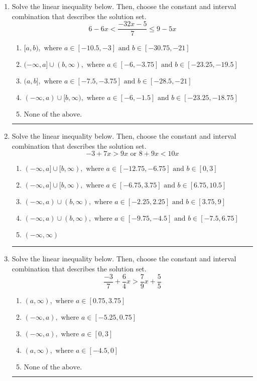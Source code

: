 \documentclass[14pt]{extbook}
\newcommand{\litem}[1]{\item#1\hspace*{-1cm}\rule{\textwidth}{0.4pt}}
\begin{document}
\begin{enumerate}
{\begin{enumerate}[label=\Alph*.]
\end{enumerate} }
\litem{
Solve the linear inequality below. Then, choose the constant and interval combination that describes the solution set.\[ 6 - 6 x < \frac{-32 x - 5}{7} \leq 9 - 5 x \]\begin{enumerate}[label=\Alph*.]
\item \( [a, b), \text{ where } a \in [-10.5, -3] \text{ and } b \in [-30.75, -21] \)
\item \( (-\infty, a] \cup (b, \infty), \text{ where } a \in [-6, -3.75] \text{ and } b \in [-23.25, -19.5] \)
\item \( (a, b], \text{ where } a \in [-7.5, -3.75] \text{ and } b \in [-28.5, -21] \)
\item \( (-\infty, a) \cup [b, \infty), \text{ where } a \in [-6, -1.5] \text{ and } b \in [-23.25, -18.75] \)
\item \( \text{None of the above.} \)

\end{enumerate} }
\litem{
Solve the linear inequality below. Then, choose the constant and interval combination that describes the solution set.\[ -3 + 7 x > 9 x \text{ or } 8 + 9 x < 10 x \]\begin{enumerate}[label=\Alph*.]
\item \( (-\infty, a] \cup [b, \infty), \text{ where } a \in [-12.75, -6.75] \text{ and } b \in [0, 3] \)
\item \( (-\infty, a] \cup [b, \infty), \text{ where } a \in [-6.75, 3.75] \text{ and } b \in [6.75, 10.5] \)
\item \( (-\infty, a) \cup (b, \infty), \text{ where } a \in [-2.25, 2.25] \text{ and } b \in [3.75, 9] \)
\item \( (-\infty, a) \cup (b, \infty), \text{ where } a \in [-9.75, -4.5] \text{ and } b \in [-7.5, 6.75] \)
\item \( (-\infty, \infty) \)

\end{enumerate} }
\litem{
Solve the linear inequality below. Then, choose the constant and interval combination that describes the solution set.\[ \frac{-3}{7} + \frac{6}{4} x > \frac{7}{9} x + \frac{5}{5} \]\begin{enumerate}[label=\Alph*.]
\item \( (a, \infty), \text{ where } a \in [0.75, 3.75] \)
\item \( (-\infty, a), \text{ where } a \in [-5.25, 0.75] \)
\item \( (-\infty, a), \text{ where } a \in [0, 3] \)
\item \( (a, \infty), \text{ where } a \in [-4.5, 0] \)
\item \( \text{None of the above}. \)


\end{enumerate}}
\end{enumerate}
\end{document}
